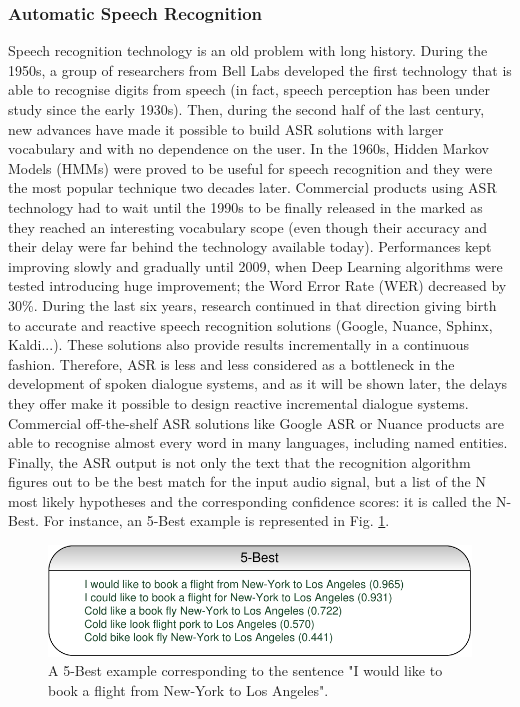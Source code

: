 		\subsubsection{Automatic Speech Recognition}

			Speech recognition technology is an old problem with long history. During the 1950s, a group of researchers from Bell Labs developed the first technology that is able to recognise digits from speech (in fact, speech perception has been under study since the early 1930s). Then, during the second half of the last century, new advances have made it possible to build ASR solutions with larger vocabulary and with no dependence on the user. In the 1960s, Hidden Markov Models (HMMs) were proved to be useful for speech recognition \cite{Gales2007} and they were the most popular technique two decades later. Commercial products using ASR technology had to wait until the 1990s to be finally released in the marked as they reached an interesting vocabulary scope (even though their accuracy and their delay were far behind the technology available today). Performances kept improving slowly and gradually until 2009, when Deep Learning algorithms were tested \cite{Mohamed2009,Deng2013} introducing huge improvement; the Word Error Rate (WER) decreased by 30\%. During the last six years, research continued in that direction giving birth to accurate and reactive speech recognition solutions (Google, Nuance, Sphinx, Kaldi...). These solutions also provide results incrementally in a continuous fashion. Therefore, ASR is less and less considered as a bottleneck in the development of spoken dialogue systems, and as it will be shown later, the delays they offer make it possible to design reactive incremental dialogue systems. Commercial off-the-shelf ASR solutions like Google ASR or Nuance products are able to recognise almost every word in many languages, including named entities. Finally, the ASR output is not only the text that the recognition algorithm figures out to be the best match for the input audio signal, but a list of the N most likely hypotheses and the corresponding confidence scores: it is called the N-Best. For instance, an 5-Best example is represented in Fig. \ref{fig:dialchain}.
			
			\begin{figure}
				\centering
				\includegraphics[scale=1]{figures/5BestEx.pdf}
				\caption{A 5-Best example corresponding to the sentence "I would like to book a flight from New-York to Los Angeles".}
				\label{fig:dialchain}
			\end{figure}
			
